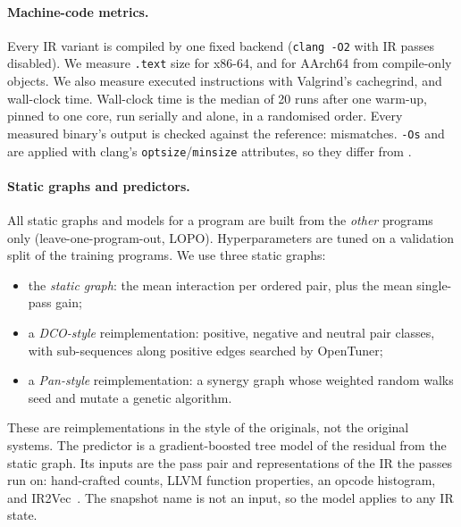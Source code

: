\paragraph{Machine-code metrics.}
Every IR variant is compiled by one fixed backend (\texttt{clang -O2} with IR passes disabled).
We measure \texttt{.text} size for x86-64, and for AArch64 from compile-only objects. We also
measure executed instructions with Valgrind's cachegrind, and wall-clock time. Wall-clock time is
the median of 20 runs after one warm-up, pinned to one core, run serially and alone, in a randomised
order. Every measured binary's output is checked against the reference: \OutputFailures{}
mismatches. \texttt{-Os} and \Oz{} are applied with clang's \texttt{optsize}/\texttt{minsize}
attributes, so they differ from \Otwo{}.

\paragraph{Static graphs and predictors.}
All static graphs and models for a program are built from the \emph{other} programs only
(leave-one-program-out, LOPO). Hyperparameters are tuned on a validation split of the training
programs. We use three static graphs:
\begin{itemize}
\item the \emph{static graph}: the mean interaction per ordered pair, plus the mean single-pass gain;
\item a \emph{DCO-style} reimplementation: positive, negative and neutral pair classes, with sub-sequences along positive edges searched by OpenTuner;
\item a \emph{Pan-style} reimplementation: a synergy graph whose weighted random walks seed and mutate a genetic algorithm.
\end{itemize}
These are reimplementations in the style of the originals, not the original systems. The
predictor is a gradient-boosted tree model of the residual from the static graph. Its inputs are
the pass pair and \NReps{} representations of the IR the passes run on: hand-crafted counts,
LLVM function properties, an opcode histogram, and IR2Vec~\cite{ir2vec}. The snapshot name is not
an input, so the model applies to any IR state.

